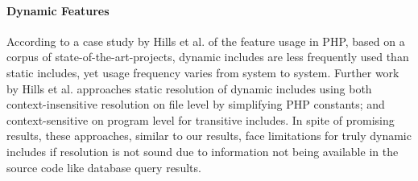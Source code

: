 
\paragraph{Dynamic Features}
According to a case study by Hills et al. \cite{Hills:2013:ESP:2483760.2483786}
of the feature usage in PHP, based on a corpus of state-of-the-art-projects,
dynamic includes are less frequently used than static includes, yet usage
frequency varies from system to system. Further work by Hills et al.
\cite{hills2014static,hills2014php} approaches static resolution of dynamic includes using
both context-insensitive resolution on file level by simplifying PHP constants;
and context-sensitive on program level for transitive includes. In spite of 
promising results, these approaches, similar to our results, face limitations
for truly dynamic includes if resolution is not sound due to information not
being available in the source code like database query results.
